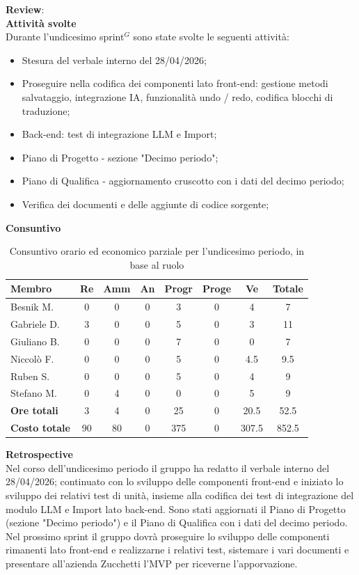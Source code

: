 \documentclass[a4paper,10pt]{article}
\begin{document}
\textbf{Review}: \\
\textbf{Attività svolte}\\
Durante l'undicesimo sprint$^G$ sono state svolte le seguenti attività:
\begin{itemize}
  \item Stesura del verbale interno del 28/04/2026;
  \item Proseguire nella codifica dei componenti lato front-end: gestione metodi salvataggio, integrazione IA, funzionalità undo / redo, codifica blocchi di traduzione;
  \item Back-end: test di integrazione LLM e Import;
  \item Piano di Progetto - sezione "Decimo periodo";
  \item Piano di Qualifica - aggiornamento cruscotto con i dati del decimo periodo;
  \item Verifica dei documenti e delle aggiunte di codice sorgente;
\end{itemize}
\textbf{Consuntivo}
\begin{table}[H]
\centering
\begin{tabular}{|l|c|c|c|c|c|c|c|}
\hline
\textbf{Membro} & \textbf{Re} & \textbf{Amm} & \textbf{An} & \textbf{Progr} & \textbf{Proge} & \textbf{Ve} & \textbf{Totale} \\
\hline
Besnik M.   & 0   & 0   & 0 & 3   & 0 & 4 & 7 \\
Gabriele D. & 3  & 0   & 0 & 5   & 0 & 3  & 11 \\
Giuliano B. & 0   & 0   & 0 & 7   & 0 & 0  & 7 \\
Niccolò F.  & 0   & 0   & 0 & 5   & 0 & 4.5  & 9.5 \\
Ruben S.    & 0 & 0   & 0 & 5   & 0 & 4  & 9 \\
Stefano M.  & 0   & 4   & 0 & 0   & 0 & 5  & 9 \\
\hline
\textbf{Ore totali} & 3  & 4 & 0 & 25  & 0 & 20.5 & 52.5 \\
\hline
\textbf{Costo totale} & 90 & 80 & 0 & 375  & 0  & 307.5 & 852.5 \\
\hline
\end{tabular}
\caption{Consuntivo orario ed economico parziale per l'undicesimo periodo, in base al ruolo}
\end{table}

\textbf{Retrospective} \\
Nel corso dell'undicesimo periodo il gruppo ha redatto il verbale interno del 28/04/2026; continuato con lo sviluppo delle componenti front-end e iniziato lo sviluppo dei relativi test di unità, insieme alla codifica dei test di integrazione del modulo LLM e Import lato back-end. Sono stati aggiornati il Piano di Progetto (sezione "Decimo periodo") e il Piano di Qualifica con i dati del decimo periodo.
Nel prossimo sprint il gruppo dovrà proseguire lo sviluppo delle componenti rimanenti lato front-end e realizzarne i relativi test, sistemare i vari documenti e presentare all'azienda Zucchetti l'MVP per riceverne l'apporvazione.
\end{document}
